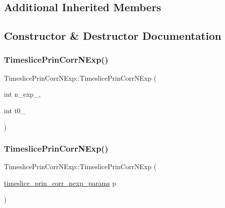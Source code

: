 \subsection*{Additional Inherited Members}


\subsection{Constructor \& Destructor Documentation}
\mbox{\label{classTimeslicePrinCorrNExp_a30e3c7e1e12c8122c8787babd1f7920c}} 
\subsubsection{\texorpdfstring{TimeslicePrinCorrNExp()}{TimeslicePrinCorrNExp()}\hspace{0.1cm}{\footnotesize\ttfamily [1/4]}}
{\footnotesize\ttfamily Timeslice\+Prin\+Corr\+N\+Exp\+::\+Timeslice\+Prin\+Corr\+N\+Exp (\begin{DoxyParamCaption}\item[{int}]{n\+\_\+exp\+\_\+,  }\item[{int}]{t0\+\_\+ }\end{DoxyParamCaption})}

\mbox{\label{classTimeslicePrinCorrNExp_a12665de55c898b2474db770de30c330c}} 
\subsubsection{\texorpdfstring{TimeslicePrinCorrNExp()}{TimeslicePrinCorrNExp()}\hspace{0.1cm}{\footnotesize\ttfamily [2/4]}}
{\footnotesize\ttfamily Timeslice\+Prin\+Corr\+N\+Exp\+::\+Timeslice\+Prin\+Corr\+N\+Exp (\begin{DoxyParamCaption}\item[{\mbox{\hyperlink{structtimeslice__prin__corr__nexp__params}{timeslice\+\_\+prin\+\_\+corr\+\_\+nexp\+\_\+params}}}]{p }\end{DoxyParamCaption})}

